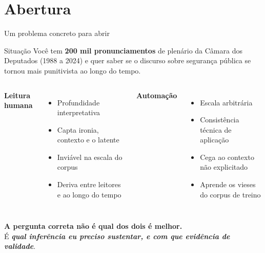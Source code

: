 \documentclass[11pt,aspectratio=169]{beamer}
\begin{document}
\section{Abertura}

\begin{frame}{Um problema concreto para abrir}
\begin{block}{Situação}
Você tem \textbf{200 mil pronunciamentos} de plenário da Câmara dos Deputados
(1988 a 2024) e quer saber se o discurso sobre segurança pública se tornou mais
punitivista ao longo do tempo.
\end{block}
\vspace{0.2cm}
\begin{columns}[T]
\textbf{Leitura humana}
\begin{itemize}\small
  \item Profundidade interpretativa
  \item Capta ironia, contexto e o latente
  \item Inviável na escala do corpus
  \item Deriva entre leitores e ao longo do tempo
\end{itemize}
\textbf{Automação}
\begin{itemize}\small
  \item Escala arbitrária
  \item Consistência técnica de aplicação
  \item Cega ao contexto não explicitado
  \item Aprende os vieses do corpus de treino
\end{itemize}
\end{columns}
\pause
\vspace{0.25cm}
\centering
\textbf{A pergunta correta não é qual dos dois é melhor.}\\
\pause
É \emph{\textbf{qual inferência eu preciso sustentar, e com que evidência de
validade}}.
\end{frame}
\end{document}
